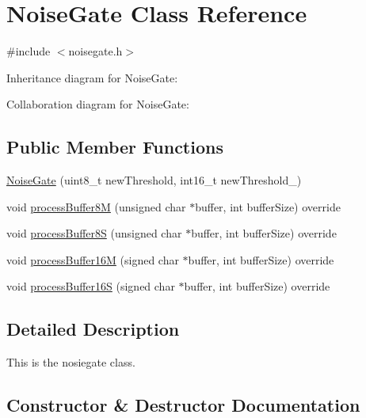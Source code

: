 \hypertarget{classNoiseGate}{}\section{Noise\+Gate Class Reference}
\label{classNoiseGate}


{\ttfamily \#include $<$noisegate.\+h$>$}



Inheritance diagram for Noise\+Gate\+:


Collaboration diagram for Noise\+Gate\+:
\subsection*{Public Member Functions}
\begin{DoxyCompactItemize}
\item 
\hyperlink{classNoiseGate_aabfeaa9f47cdec0eb5f2d0c481f506a7}{Noise\+Gate} (uint8\+\_\+t new\+Threshold, int16\+\_\+t new\+Threshold\+\_)
\item 
void \hyperlink{classNoiseGate_a01d2a4ba032b2b853f19d5f02c998c53}{process\+Buffer8M} (unsigned char $\ast$buffer, int buffer\+Size) override
\item 
void \hyperlink{classNoiseGate_a95221bfd9afb4a23bfb0b63122e62f26}{process\+Buffer8S} (unsigned char $\ast$buffer, int buffer\+Size) override
\item 
void \hyperlink{classNoiseGate_a56265390315ad1c22571742d50453f36}{process\+Buffer16M} (signed char $\ast$buffer, int buffer\+Size) override
\item 
void \hyperlink{classNoiseGate_ad4da7fd52a07d637e24e69475d1ed89f}{process\+Buffer16S} (signed char $\ast$buffer, int buffer\+Size) override
\end{DoxyCompactItemize}


\subsection{Detailed Description}
This is the nosiegate class. 

\subsection{Constructor \& Destructor Documentation}
\mbox{\label{classNoiseGate_aabfeaa9f47cdec0eb5f2d0c481f506a7}} 
